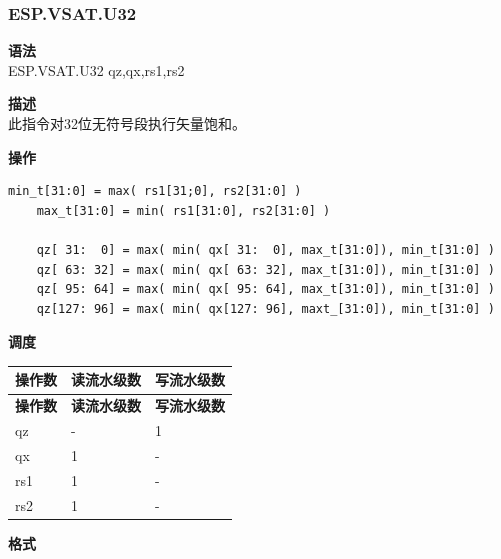 \newpage

\newpage
\subsubsection{ESP.VSAT.U32}\label{instruction:ESPVSATU32}
\textbf{语法}\\
ESP.VSAT.U32 qz,qx,rs1,rs2

\textbf{描述}\\
此指令对32位无符号段执行矢量饱和。

\textbf{操作}\\
\begin{lstlisting}[escapeinside=`?]
    min_t[31:0] = max( rs1[31;0], rs2[31:0] )
    max_t[31:0] = min( rs1[31:0], rs2[31:0] )

    qz[ 31:  0] = max( min( qx[ 31:  0], max_t[31:0]), min_t[31:0] )
    qz[ 63: 32] = max( min( qx[ 63: 32], max_t[31:0]), min_t[31:0] )
    qz[ 95: 64] = max( min( qx[ 95: 64], max_t[31:0]), min_t[31:0] )
    qz[127: 96] = max( min( qx[127: 96], maxt_[31:0]), min_t[31:0] )

\end{lstlisting}


\textbf{调度}\\
\begin{longtable}[c]{|l|l|l|}
    \hline
    \rowcolor{lightgray}
    \textbf{操作数} & \textbf{读流水级数} & \textbf{写流水级数} \\\hline
    \endfirsthead
    \hline
    \rowcolor{lightgray}
     \textbf{操作数} & \textbf{读流水级数} & \textbf{写流水级数} \\\hline
    \endhead
    \hline
    \endfoot

  qz & - & 1 \\\hline
    qx & 1 & - \\\hline
    rs1 & 1 & - \\\hline
    rs2 & 1 & -

\end{longtable}

\textbf{格式}\\

